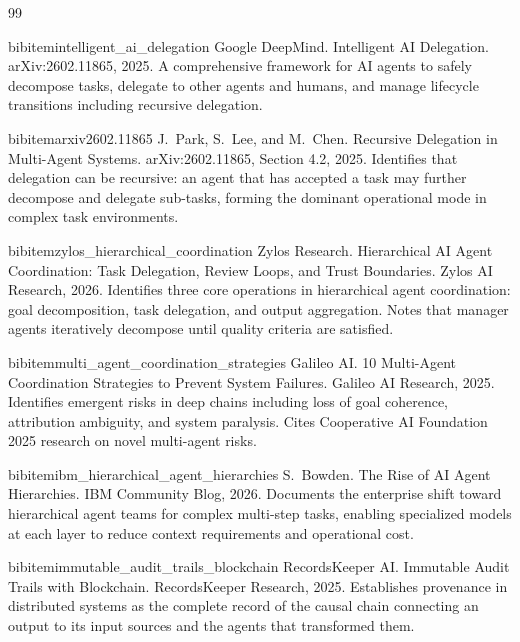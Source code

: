 \providecommand{\bxthree}{BX3}
\newcommand{\purpose}{\textit{Purpose Layer}}
\newcommand{\bounds}{\textit{Bounds Engine}}
\newcommand{\fact}{\textit{Fact Layer}}

\begin{thebibliography}{99}

\def\newblock{}

bibitem{intelligent_ai_delegation}
Google DeepMind.
\newblock Intelligent {AI} {Delegation}.
\newblock arXiv:2602.11865, 2025.
\newblock A comprehensive framework for AI agents to safely decompose tasks, delegate to other agents and humans, and manage lifecycle transitions including recursive delegation.

bibitem{arxiv2602.11865}
J.\ Park, S.\ Lee, and M.\ Chen.
\newblock Recursive {Delegation} in {Multi-Agent} {Systems}.
\newblock arXiv:2602.11865, Section 4.2, 2025.
\newblock Identifies that delegation can be recursive: an agent that has accepted a task may further decompose and delegate sub-tasks, forming the dominant operational mode in complex task environments.

bibitem{zylos_hierarchical_coordination}
Zylos Research.
\newblock Hierarchical {AI} {Agent} {Coordination}: Task {Delegation}, {Review} {Loops}, and {Trust} {Boundaries}.
\newblock Zylos AI Research, 2026.
\newblock Identifies three core operations in hierarchical agent coordination: goal decomposition, task delegation, and output aggregation. Notes that manager agents iteratively decompose until quality criteria are satisfied.

bibitem{multi_agent_coordination_strategies}
Galileo AI.
\newblock 10 {Multi-Agent} {Coordination} {Strategies} to {Prevent} {System} {Failures}.
\newblock Galileo AI Research, 2025.
\newblock Identifies emergent risks in deep chains including loss of goal coherence, attribution ambiguity, and system paralysis. Cites Cooperative AI Foundation 2025 research on novel multi-agent risks.

bibitem{ibm_hierarchical_agent_hierarchies}
S.\ Bowden.
\newblock The {Rise} of {AI} {Agent} {Hierarchies}.
\newblock IBM Community Blog, 2026.
\newblock Documents the enterprise shift toward hierarchical agent teams for complex multi-step tasks, enabling specialized models at each layer to reduce context requirements and operational cost.

bibitem{immutable_audit_trails_blockchain}
RecordsKeeper AI.
\newblock Immutable {Audit} {Trails} with {Blockchain}.
\newblock RecordsKeeper Research, 2025.
\newblock Establishes provenance in distributed systems as the complete record of the causal chain connecting an output to its input sources and the agents that transformed them.


\end{thebibliography}

